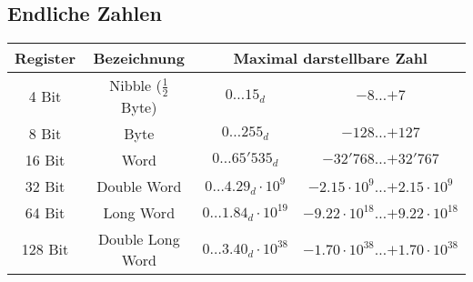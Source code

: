 \subsection{Endliche Zahlen}\label{subsec:endliche-zahlen}

\begin{center}
    \begin{tabular}{|c|c|c|c|}
        \hline
        Register & Bezeichnung & \multicolumn{2}{c|}{Maximal darstellbare Zahl} \\
        \hline
        \hline
        4 Bit   & Nibble ($\frac{1}{2}$ Byte) & $0 \dots 15_d$                 & $-8 \dots \text{+}7$                                   \\
        \hline
        8 Bit   & Byte                        & $0 \dots 255_d$                & $-128 \dots \text{+}127$                               \\
        \hline
        16 Bit  & Word                        & $0 \dots 65'535_d$             & $-32'768 \dots \text{+}32'767$                         \\
        \hline
        32 Bit  & Double Word                 & $0 \dots 4.29_d \cdot 10^9$    & $-2.15 \cdot 10^9 \dots \text{+}2.15 \cdot 10^9$       \\
        \hline
        64 Bit  & Long Word                   & $0 \dots 1.84_d \cdot 10^{19}$ & $-9.22 \cdot 10^{18} \dots \text{+}9.22 \cdot 10^{18}$ \\
        \hline
        128 Bit & Double Long Word            & $0 \dots 3.40_d \cdot 10^{38}$ & $-1.70 \cdot 10^{38} \dots \text{+}1.70 \cdot 10^{38}$ \\
        \hline
    \end{tabular}
\end{center}